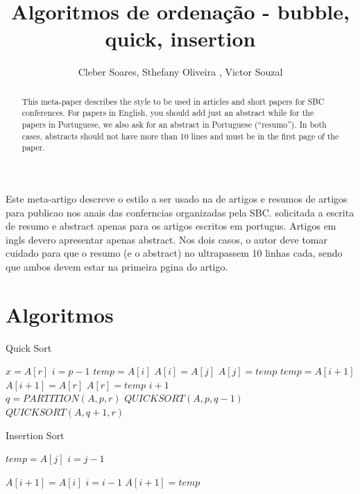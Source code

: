 \documentclass[12pt]{article}
\title{Algoritmos de ordenação - bubble, quick, insertion}
\author{Cleber Soares\inst{1},  Sthefany Oliveira \inst{1}, Victor Souzal\inst{1} }
\let\oldReturn\Return
\renewcommand{\Return}{\State\oldReturn}
\begin{document}
 

\maketitle

\begin{abstract}
  This meta-paper describes the style to be used in articles and short papers
  for SBC conferences. For papers in English, you should add just an abstract
  while for the papers in Portuguese, we also ask for an abstract in
  Portuguese (``resumo''). In both cases, abstracts should not have more than
  10 lines and must be in the first page of the paper.
\end{abstract}
     
\begin{resumo} 
  Este meta-artigo descreve o estilo a ser usado na  de artigos e
  resumos de artigos para publicao nos anais das conferncias organizadas
  pela SBC.  solicitada a escrita de resumo e abstract apenas para os artigos
  escritos em portugus. Artigos em ingls devero apresentar apenas abstract.
  Nos dois casos, o autor deve tomar cuidado para que o resumo (e o abstract)
  no ultrapassem 10 linhas cada, sendo que ambos devem estar na primeira
  pgina do artigo.
\end{resumo}	
	
\section{Algoritmos}	
	\begin{algorithm}
		\caption{Quick Sort}
		\begin{algorithmic}[1]	
				\State $x = A[r] $	
				\State $i = p - 1$
						\State$temp = A[i]$
						\State$A[i] = A[j]$
						\State$A[j] = temp$
					\EndIf
				\EndFor
				\State$temp = A[i + 1]$
				\State$A[i + 1] = A[r]$
				\State$A[r] = temp$
				\Return $i + 1$
			\EndFunction
			\\
					\State$q = PARTITION(A, p, r)$
					\State$QUICKSORT(A, p, q - 1 )$
					\State$QUICKSORT(A, q +1, r)$
				\EndIf			
			\EndFunction
			
			
		\end{algorithmic}
	\end{algorithm}
	
	
	\begin{algorithm}
		\caption{Insertion Sort}
		\begin{algorithmic}[1]

			\Function{partition}{$A, p, r$}		
				\For{$j = 2$ to $ n $ }
					\State $temp = A[j]$	
					\State $i = j - 1$		
										
					\While{$ ( i > 0 ) $ \And $ ( A[i] > temp ) $} 
						\State$A[i + 1] = A[i]$
						\State$i = i - 1 $
					\EndWhile
					\State$A[i + 1] = temp$				
				\EndFor
				
				
			\EndFunction
			
			
		\end{algorithmic}
	\end{algorithm}
\end{document}

